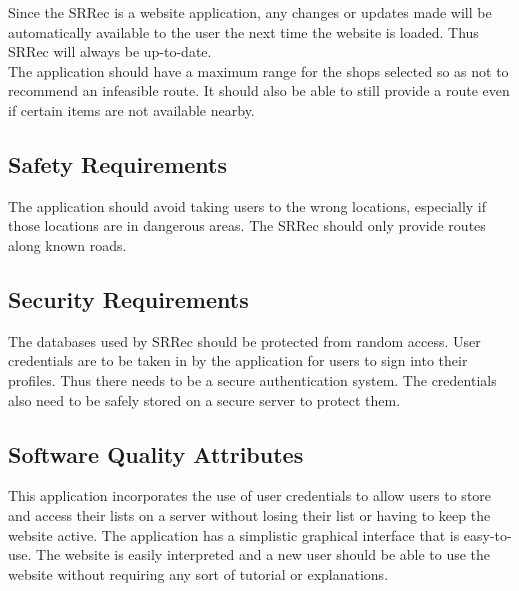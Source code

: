 \documentclass[10pt, a4paper, onecolumn]{scrartcl}
\begin{document}
			Since the SRRec is a website application, any changes or updates made will be automatically available to the user the next time the website is loaded. Thus SRRec will always be up-to-date.\\
		
			The application should have a maximum range for the shops selected so as not to recommend an infeasible route. It should also be able to still provide a route even if certain items are not available nearby.
		
		\subsection{Safety Requirements}
		
			The application should avoid taking users to the wrong locations, especially if those locations are in dangerous areas. The SRRec should only provide routes along known roads.
		
		\subsection{Security Requirements}
		
			The databases used by SRRec should be protected from random access. User credentials are to be taken in by the application for users to sign into their profiles. Thus there needs to be a secure authentication system. The credentials also need to be safely stored on a secure server to protect them.
		
		\subsection{Software Quality Attributes}
			
			This application incorporates the use of user credentials to allow users to store and access their lists on a 	server without losing their list or having to keep the website active. The application has a simplistic graphical interface that is easy-to-use. The website is easily interpreted and a new user should be able to use the website without requiring any sort of tutorial or explanations.
		
%		
		
	
	
	
\end{document}
